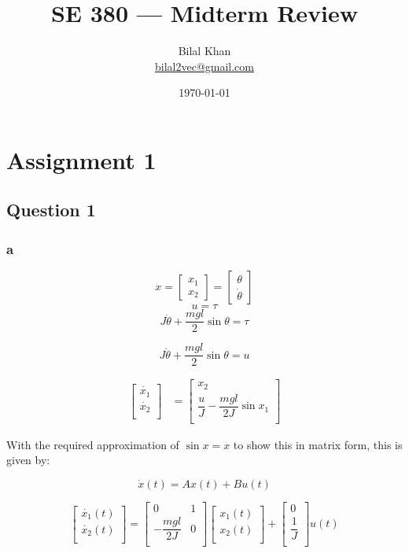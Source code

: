 \documentclass[11pt]{article}
\title{SE 380 — Midterm Review}
\author{Bilal Khan\\
\href{mailto:bilal2vec@gmail.com}{bilal2vec@gmail.com}}
\date{\today}
\begin{document}
\maketitle

\tableofcontents

\section{Assignment 1}

\subsection{Question 1}

\subsubsection{a}

\[ x = \begin{bmatrix} x_1 \\ x_2 \end{bmatrix} = \begin{bmatrix} \theta \\ \dot{\theta} \end{bmatrix} \]
\[ u = \tau \]
\[ J \ddot{\theta} + \dfrac{mgl}{2} \sin \theta = \tau \]

\[ J \ddot{\theta} + \dfrac{mgl}{2} \sin \theta = u \]

\begin{align*}
    \begin{bmatrix}
        \dot{x_1} \\
        \dot{x_2} \\
    \end{bmatrix}
    &=
    \begin{bmatrix}
        x_2 \\
        \dfrac{u}{J} - \dfrac{mgl}{2J} \sin x_1 \\
    \end{bmatrix}
\end{align*}

With the required approximation of $\sin x = x$ to show this in matrix form, this is given by:

\[ \dot{x}(t) = A x(t) + Bu(t) \]

\[
\begin{bmatrix}
    \dot{x_1}(t) \\
    \dot{x_2}(t) \\
\end{bmatrix}
=
\begin{bmatrix}
    0 & 1 \\
    - \dfrac{mgl}{2J} & 0 \\
\end{bmatrix}
\begin{bmatrix}
    x_1(t) \\
    x_2(t) \\
\end{bmatrix}
+
\begin{bmatrix}
    0 \\
    \dfrac{1}{J} \\
\end{bmatrix}
u(t)
\]
\end{document}
